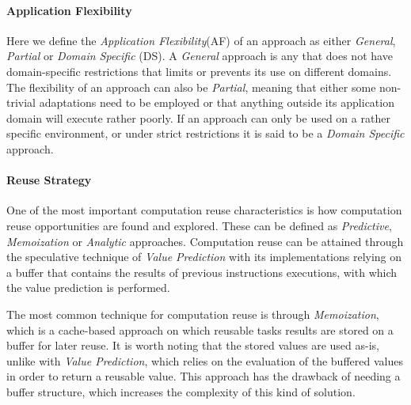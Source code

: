 
\paragraph{Application Flexibility}

Here we define the {\it Application Flexibility}(AF) of an approach as either {\it General}, {\it Partial} or {\it Domain Specific} (DS). A {\it General} approach is any that does not have domain-specific restrictions that limits or prevents its use on different domains. The flexibility of an approach can also be {\it Partial}, meaning that either some non-trivial adaptations need to be employed or that anything outside its application domain will execute rather poorly. If an approach can only be used on a rather specific environment, or under strict restrictions it is said to be a {\it Domain Specific} approach.

\paragraph{Reuse Strategy}

One of the most important computation reuse characteristics is how computation reuse opportunities are found and explored. These can be defined as {\it Predictive}, {\it Memoization} or {\it Analytic} approaches. Computation reuse can be attained through the speculative technique of {\it Value Prediction} \cite{reuse2,reuse10} with its implementations relying on a buffer that contains the results of previous instructions executions, with which the value prediction is performed.

The most common technique for computation reuse is through {\it Memoization}, which is a cache-based approach on which reusable tasks results are stored on a buffer for later reuse. It is worth noting that the stored values are used as-is, unlike with {\it Value Prediction}, which relies on the evaluation of the buffered values in order to return a reusable value. This approach has the drawback of needing a buffer structure, which increases the complexity of this kind of solution.

